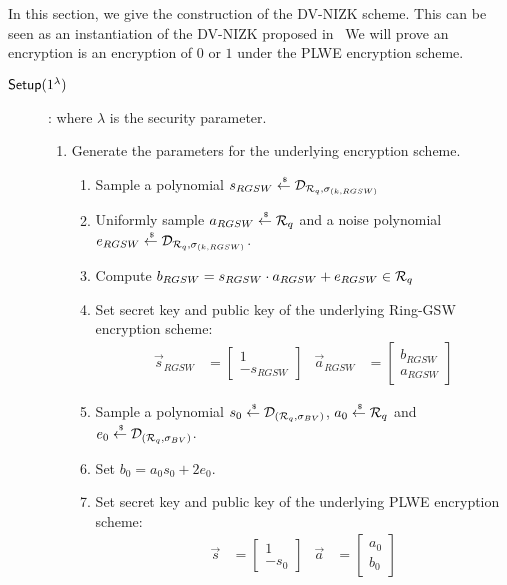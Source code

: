 In this section, we give the construction of the DV-NIZK scheme.
This can be seen as an instantiation of the DV-NIZK proposed in~\cite{DBLP:conf/pkc/ChaidosG15}
We will prove an encryption is an encryption of $0$ or $1$ under the PLWE encryption scheme.

\begin{description}
\item[${\mathsf{Setup}}(1^\lambda)$]: where $\lambda$ is the security parameter.
  \begin{enumerate}
    \item Generate the parameters for the underlying encryption scheme.
      \begin{enumerate}
      \item Sample a polynomial $s_{RGSW} \stackrel{{\scriptscriptstyle \mkern4mu \$}}{\gets} \mathcal{D}_{{\mathcal{R}}_q, \sigma_{(k,RGSW)}}$
      \item Uniformly sample $a_{RGSW} \stackrel{{\scriptscriptstyle \mkern4mu \$}}{\gets} {\mathcal{R}}_q$ and a noise polynomial $e_{RGSW} \stackrel{{\scriptscriptstyle \mkern4mu \$}}{\gets} \mathcal{D}_{{\mathcal{R}}_q, \sigma_{(k, RGSW)}}$.
      \item Compute $b_{RGSW} = s_{RGSW} \cdot a_{RGSW} + e_{RGSW} \in {\mathcal{R}}_q$
      \item Set secret key and public key of the underlying Ring-GSW encryption scheme:
        \begin{align*}
          \vec{s}_{RGSW} &= \begin{bmatrix} 1 \\ -s_{RGSW} \end{bmatrix}  & \vec{a}_{RGSW} &=  \begin{bmatrix} b_{RGSW} \\ a_{RGSW}\end{bmatrix}
        \end{align*}
      \item Sample a polynomial $s_0 \stackrel{{\scriptscriptstyle \mkern4mu \$}}{\gets} \mathcal{D}_{({\mathcal{R}}_q, \sigma_{BV})}$, $a_0 \stackrel{{\scriptscriptstyle \mkern4mu \$}}{\gets} {\mathcal{R}}_q$ and $e_0 \stackrel{{\scriptscriptstyle \mkern4mu \$}}{\gets} \mathcal{D}_{({\mathcal{R}}_q, \sigma_{BV})}$.
      \item Set $b_0 = a_0 s_0 + 2 e_0$.
      \item Set secret key and public key of the underlying PLWE encryption scheme:
        \begin{align*}
          \vec{s} &= \begin{bmatrix} 1 \\ -s_0\end{bmatrix} & \vec{a} &= \begin{bmatrix} a_0 \\ b_0\end{bmatrix}

\end{align*}
\end{enumerate}
\end{enumerate}
\end{description}
